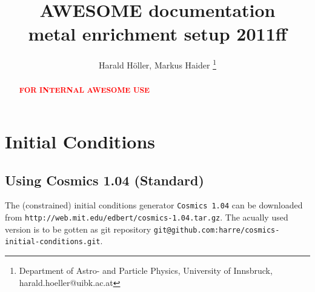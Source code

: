 \documentclass[a4paper,english,10.5pt]{scrartcl}
\title{AWESOME documentation \\
metal enrichment setup 2011ff}
\author{Harald H\"oller, Markus Haider \thanks{Department of Astro- and Particle Physics, 
University of Innsbruck, harald.hoeller@uibk.ac.at}}
\begin{document}
\maketitle 

\begin{abstract}
\textcolor{red}{\bf FOR INTERNAL AWESOME USE}
\end{abstract}

\section{Initial Conditions}
\subsection{Using Cosmics 1.04 (Standard)}

The (constrained) initial conditions generator \texttt{Cosmics 1.04} 
can be downloaded from \texttt{http://web.mit.edu/edbert/cosmics-1.04.tar.gz}. 
The acually used version is to be gotten as git repository
\texttt{git@github.com:harre/cosmics-initial-conditions.git}. 
\end{document}
